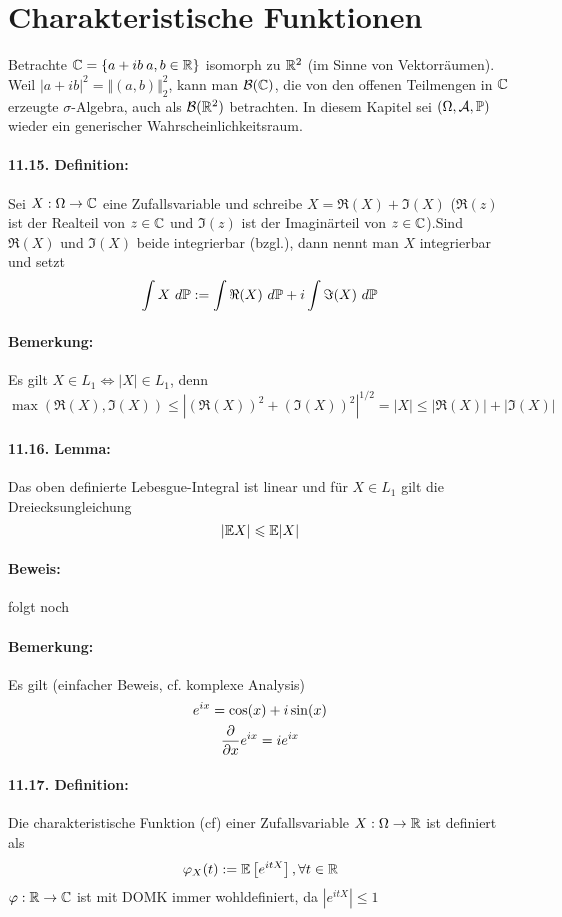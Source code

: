 \documentclass[11pt]{report}
\begin{document}
\section*{Charakteristische Funktionen}
Betrachte $\mathbb{C}=\{a+ib\:a,b\in\mathbb{R}\}$ isomorph zu $\mathbb{R}^2$ (im Sinne von Vektorr\"aumen). Weil $|a+ib|^2=\Vert(a,b)\Vert_2^2$, kann man $\mathcal{B}(\mathbb{C})$, die von den offenen Teilmengen in $\mathbb{C}$ erzeugte $\sigma$-Algebra, auch als $\mathcal{B}(\mathbb{R}^2)$ betrachten. In diesem Kapitel sei $(\Omega, \mathcal{A}, \mathbb{P})$ wieder ein generischer Wahrscheinlichkeitsraum.

\paragraph{11.15. Definition:} Sei $X:\Omega\to\mathbb{C}$ eine Zufallsvariable und schreibe $X=\Re(X)+\Im(X)$ ($\Re(z)$ ist der Realteil von $z\in\mathbb{C}$ und $\Im(z)$ ist der Imagin\"arteil von $z\in\mathbb{C}$).Sind $\Re(X)$ und $\Im(X)$ beide integrierbar (bzgl.), dann nennt man $X$ integrierbar und setzt
$$\int X\ d\Pp:=\int\Re(X)\ d\Pp+i\int\Im(X)\ d\Pp$$
\paragraph{Bemerkung:} Es gilt $X\in L_1\iff |X|\in L_1$, denn
$$\max(\Re(X),\Im(X))\leq|(\Re(X))^2+(\Im(X))^2|^{1/2}=|X|\leq|\Re(X)|+|\Im(X)|$$

\paragraph{11.16. Lemma:} Das oben definierte Lebesgue-Integral ist linear und f\"ur $X\in L_1$ gilt die Dreiecksungleichung
$$|\mathbb{E} X|\leqslant\mathbb{E}|X|$$

\paragraph{Beweis:} folgt noch %

\paragraph{Bemerkung:} Es gilt (einfacher Beweis, cf. komplexe Analysis)
\begin{gather*}
    e^{ix}=\cos(x)+i\sin(x) \\
    \dfrac{\partial}{\partial x}e^{ix}=ie^{ix}
\end{gather*}
 
\paragraph{11.17. Definition:} Die charakteristische Funktion (cf) einer Zufallsvariable $X:\Omega\to\mathbb{R}$ ist definiert als
$$\varphi_X(t):=\mathbb{E} \left[e^{itX}\right],\forall t\in\mathbb{R}$$
$\varphi:\mathbb{R}\to\mathbb{C}$ ist mit DOMK immer wohldefiniert, da $\left|e^{itX}\right|\leq1$
\end{document}
